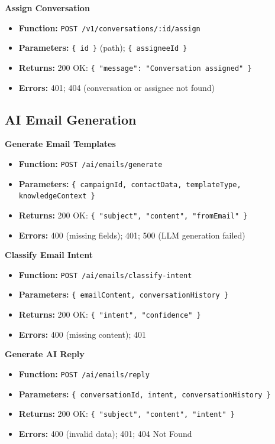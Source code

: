 \documentclass[a4paper]{article}
\begin{document}
\textbf{Assign Conversation}
\begin{itemize}
  \item \textbf{Function:} \texttt{POST /v1/conversations/:id/assign}
  \item \textbf{Parameters:} \texttt{\{ id \}} (path); \texttt{\{ assigneeId \}}
  \item \textbf{Returns:} 200 OK: \texttt{\{ "message": "Conversation assigned" \}}
  \item \textbf{Errors:} 401; 404 (conversation or assignee not found)
\end{itemize}

\subsection{AI Email Generation}

\textbf{Generate Email Templates}
\begin{itemize}
  \item \textbf{Function:} \texttt{POST /ai/emails/generate}
  \item \textbf{Parameters:} \texttt{\{ campaignId, contactData, templateType, knowledgeContext \}}
  \item \textbf{Returns:} 200 OK: \texttt{\{ "subject", "content", "fromEmail" \}}
  \item \textbf{Errors:} 400 (missing fields); 401; 500 (LLM generation failed)
\end{itemize}

\textbf{Classify Email Intent}
\begin{itemize}
  \item \textbf{Function:} \texttt{POST /ai/emails/classify-intent}
  \item \textbf{Parameters:} \texttt{\{ emailContent, conversationHistory \}}
  \item \textbf{Returns:} 200 OK: \texttt{\{ "intent", "confidence" \}}
  \item \textbf{Errors:} 400 (missing content); 401
\end{itemize}

\textbf{Generate AI Reply}
\begin{itemize}
  \item \textbf{Function:} \texttt{POST /ai/emails/reply}
  \item \textbf{Parameters:} \texttt{\{ conversationId, intent, conversationHistory \}}
  \item \textbf{Returns:} 200 OK: \texttt{\{ "subject", "content", "intent" \}}
  \item \textbf{Errors:} 400 (invalid data); 401; 404 Not Found
\end{itemize}
\end{document}
